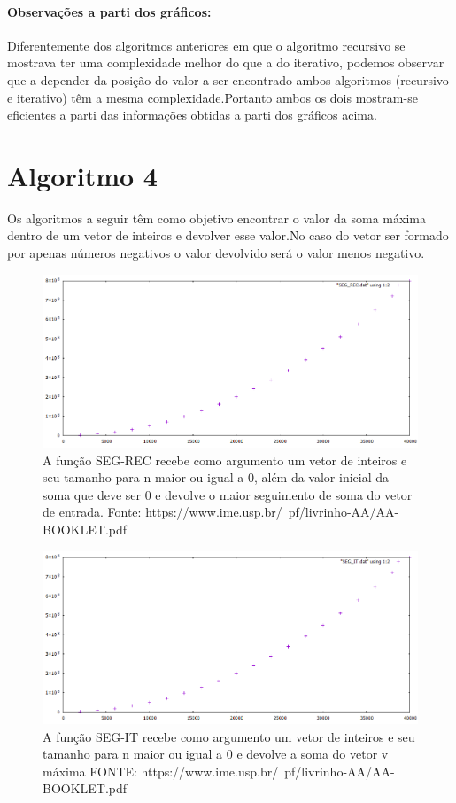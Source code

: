 \documentclass[12pt]{article}
\begin{document}
	
	\paragraph{Observações a parti dos gráficos: } Diferentemente dos algoritmos anteriores em que o algoritmo recursivo se mostrava ter uma complexidade melhor do que a do iterativo, podemos observar que a depender da posição do valor a ser encontrado ambos algoritmos (recursivo e iterativo) têm a mesma complexidade.Portanto ambos os dois mostram-se eficientes a parti das informações obtidas a parti dos gráficos acima.
	
	\section{Algoritmo 4} \label{sec: SEG}
	Os algoritmos a seguir têm como objetivo encontrar o valor da soma máxima dentro de um vetor de inteiros e devolver esse valor.No caso do vetor ser formado por apenas números negativos o valor devolvido será o valor menos negativo.
	
	
	\begin{figure}[ht]
		\centering
		\includegraphics[width=0.7\linewidth]{Graficos/SEG_REC}
		\caption[Gráfico SEG-REC]{A função SEG-REC recebe como argumento um vetor de inteiros e seu tamanho para n maior ou igual a 0, além da valor inicial da soma que deve ser 0 e devolve o maior seguimento de soma do vetor de entrada. Fonte: https://www.ime.usp.br/~pf/livrinho-AA/AA-BOOKLET.pdf}
		\label{fig:segrec}
	\end{figure}
	
	\pagebreak
	\begin{figure}[t]
		\centering
		\includegraphics[width=0.7\linewidth]{Graficos/SEG_IT}
		\caption[Gráfico SEG-IT]{A função SEG-IT recebe como argumento um vetor de inteiros e seu tamanho para n maior ou igual a 0 e devolve a soma do vetor v máxima FONTE: https://www.ime.usp.br/~pf/livrinho-AA/AA-BOOKLET.pdf}
		\label{fig:segit}
	\end{figure}
	
\end{document}
